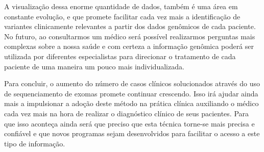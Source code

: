 A visualização dessa enorme quantidade de dados, também é uma área em constante evolução, e que promete facilitar cada vez mais a identificação de variantes clinicamente relevantes a partir dos dados genômicos de cada paciente. No futuro, ao consultarmos um médico será possível realizarmos perguntas mais complexas sobre a nossa saúde e com certeza a informação genômica poderá ser utilizada por diferentes especialistas para direcionar o tratamento de cada paciente de uma maneira um pouco mais individualizada.

Para concluir, o aumento do número de casos clínicos solucionados através do uso de sequenciamento de exomas promete continuar crescendo. Isso irá ajudar ainda mais a impulsionar a adoção deste método na prática clínica auxiliando o médico cada vez mais na hora de realizar o diagnóstico clínico de seus pacientes. Para que isso aconteça ainda será que preciso que esta técnica torne-se mais precisa e confiável e que novos programas sejam desenvolvidos para facilitar o acesso a este tipo de informação.